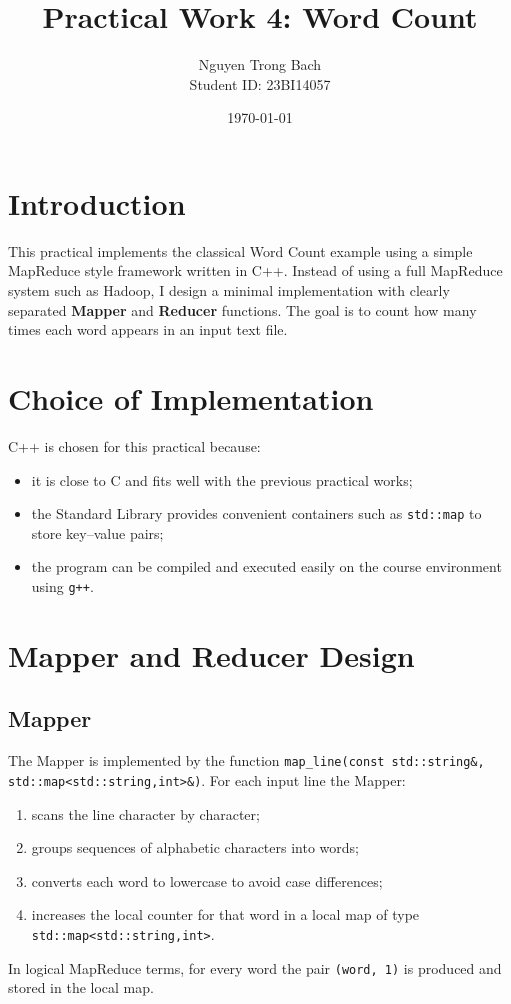 \documentclass[a4paper,11pt]{article}
\title{Practical Work 4: Word Count}
\author{Nguyen Trong Bach \\ Student ID: 23BI14057}
\date{\today}
\begin{document}
\maketitle

\section{Introduction}
This practical implements the classical Word Count example using
a simple MapReduce style framework written in C++. Instead of using
a full MapReduce system such as Hadoop, I design a minimal
implementation with clearly separated \textbf{Mapper} and
\textbf{Reducer} functions. The goal is to count how many times each
word appears in an input text file.

\section{Choice of Implementation}
C++ is chosen for this practical because:
\begin{itemize}
  \item it is close to C and fits well with the previous practical works;
  \item the Standard Library provides convenient containers such as
  \texttt{std::map} to store key--value pairs;
  \item the program can be compiled and executed easily on the course
  environment using \texttt{g++}.
\end{itemize}

\section{Mapper and Reducer Design}

\subsection*{Mapper}
The Mapper is implemented by the function
\texttt{map\_line(const std::string\&, std::map<std::string,int>\&)}.
For each input line the Mapper:
\begin{enumerate}
  \item scans the line character by character;
  \item groups sequences of alphabetic characters into words;
  \item converts each word to lowercase to avoid case differences;
  \item increases the local counter for that word in a local
  map of type \texttt{std::map<std::string,int>}.
\end{enumerate}
In logical MapReduce terms, for every word the pair
\texttt{(word, 1)} is produced and stored in the local map.
\end{document}
